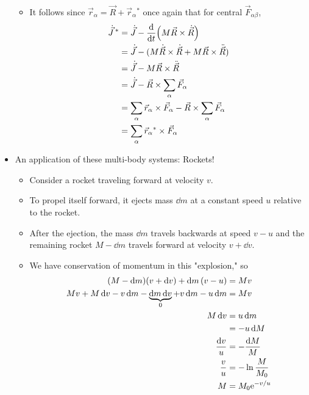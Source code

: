 \documentclass[../notes.tex]{subfiles}
\begin{document}
\begin{itemize}
\begin{itemize}
\begin{align*}
        \end{align*}
        \item It follows since $\vec{r}_\alpha=\vec{R}+\vec{r}_\alpha{}^*$ once again that for central $\vec{F}_{\alpha\beta}$,
        \begin{align*}
            \dot{\vec{J}}{\,}^* &= \dot{\vec{J}}-\dv{t}(M\vec{R}\times\dot{\vec{R}})\\
            &= \dot{\vec{J}}-(M\dot{\vec{R}}\times\dot{\vec{R}}+M\vec{R}\times\ddot{\vec{R}})\\
            &= \dot{\vec{J}}-M\vec{R}\times\ddot{\vec{R}}\\
            &= \dot{\vec{J}}-\vec{R}\times\sum_\alpha\vec{F}_\alpha\\
            &= \sum_\alpha\vec{r}_\alpha\times\vec{F}_\alpha-\vec{R}\times\sum_\alpha\vec{F}_\alpha\\
            &= \sum_\alpha\vec{r}_\alpha{}^*\times\vec{F}_\alpha
        \end{align*}
    \end{itemize}
    \item An application of these multi-body systems: Rockets!
    \begin{itemize}
        \item Consider a rocket traveling forward at velocity $v$.
        \item To propel itself forward, it ejects mass $\dd{m}$ at a constant speed $u$ relative to the rocket.
        \item After the ejection, the mass $\dd{m}$ travels backwards at speed $v-u$ and the remaining rocket $M-\dd{m}$ travels forward at velocity $v+\dd{v}$.
        \item We have conservation of momentum in this "explosion," so
        \begin{align*}
            (M-\dd{m})(v+\dd{v})+\dd{m}(v-u) &= Mv\\
            Mv+M\dd{v}-v\dd{m}-\underbrace{\dd{m}\dd{v}}_0+v\dd{m}-u\dd{m} &= Mv\\
            M\dd{v} &= u\dd{m}\\
            &= -u\dd{M}\\
            \frac{\dd{v}}{u} &= -\frac{\dd{M}}{M}\\
            \frac{v}{u} &= -\ln\frac{M}{M_0}\\
            M &= M_0\e[-v/u]
        \end{align*}
    \end{itemize}
\end{itemize}
\end{document}
